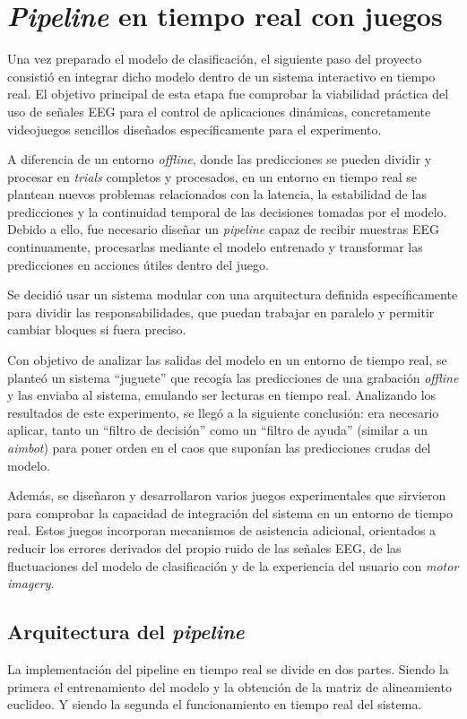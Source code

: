 \section{\textit{Pipeline} en tiempo real con juegos}
\label{sec:pipeline_tiempo_real}

Una vez preparado el modelo de clasificación, el siguiente paso del proyecto consistió en integrar dicho modelo dentro de un sistema interactivo en tiempo real. El objetivo principal de esta etapa fue comprobar la viabilidad práctica del uso de señales EEG para el control de aplicaciones dinámicas, concretamente videojuegos sencillos diseñados específicamente para el experimento.

A diferencia de un entorno \textit{offline}, donde las predicciones se pueden dividir y procesar en \textit{trials} completos y procesados, en un entorno en tiempo real se plantean nuevos problemas relacionados con la latencia, la estabilidad de las predicciones y la continuidad temporal de las decisiones tomadas por el modelo. Debido a ello, fue necesario diseñar un \textit{pipeline} capaz de recibir muestras EEG continuamente, procesarlas mediante el modelo entrenado y transformar las predicciones en acciones útiles dentro del juego.

Se decidió usar un sistema modular con una arquitectura definida específicamente para dividir las responsabilidades, que puedan trabajar en paralelo y permitir cambiar bloques si fuera preciso.

Con objetivo de analizar las salidas del modelo en un entorno de tiempo real, se planteó un sistema ``juguete'' que recogía las predicciones de una grabación \textit{offline} y las enviaba al sistema, emulando ser lecturas en tiempo real. Analizando los resultados de este experimento, se llegó a la siguiente conclusión: era necesario aplicar, tanto un ``filtro de decisión'' como un ``filtro de ayuda'' (similar a un \textit{aimbot}) para poner orden en el caos que suponían las predicciones crudas del modelo.

Además, se diseñaron y desarrollaron varios juegos experimentales que sirvieron para comprobar la capacidad de integración del sistema en un entorno de tiempo real. Estos juegos incorporan mecanismos de asistencia adicional, orientados a reducir los errores derivados del propio ruido de las señales EEG, de las fluctuaciones del modelo de clasificación y de la experiencia del usuario con \textit{motor imagery}.

\subsection{Arquitectura del \textit{pipeline}}
\label{subsec:arquitectura}
La implementación del pipeline en tiempo real se divide en dos partes. Siendo la primera el entrenamiento del modelo y la obtención de la matriz de alineamiento euclideo. Y siendo la segunda el funcionamiento en tiempo real del sistema. 

